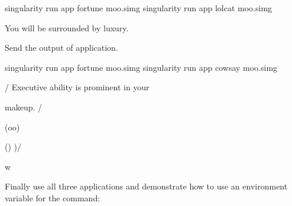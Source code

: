 \documentclass[letterpaper,10pt,english]{sphinxmanual}
\begin{document}
%
\begin{sphinxVerbatim}[commandchars=\\\{\}]
singularity run \PYGZhy{}\PYGZhy{}app fortune moo.simg \textbar{} singularity run \PYGZhy{}\PYGZhy{}app lolcat moo.simg

You will be surrounded by luxury.
\end{sphinxVerbatim}

Send the output of  application.

%
\begin{sphinxVerbatim}[commandchars=\\\{\}]
singularity run \PYGZhy{}\PYGZhy{}app fortune moo.simg \textbar{} singularity run \PYGZhy{}\PYGZhy{}app cowsay moo.simg

 \PYGZus{}\PYGZus{}\PYGZus{}\PYGZus{}\PYGZus{}\PYGZus{}\PYGZus{}\PYGZus{}\PYGZus{}\PYGZus{}\PYGZus{}\PYGZus{}\PYGZus{}\PYGZus{}\PYGZus{}\PYGZus{}\PYGZus{}\PYGZus{}\PYGZus{}\PYGZus{}\PYGZus{}\PYGZus{}\PYGZus{}\PYGZus{}\PYGZus{}\PYGZus{}\PYGZus{}\PYGZus{}\PYGZus{}\PYGZus{}\PYGZus{}\PYGZus{}\PYGZus{}\PYGZus{}\PYGZus{}\PYGZus{}\PYGZus{}\PYGZus{}\PYGZus{}\PYGZus{}

/ Executive ability is prominent in your \PYGZbs{}

\PYGZbs{} make\PYGZhy{}up.                               /

 \PYGZhy{}\PYGZhy{}\PYGZhy{}\PYGZhy{}\PYGZhy{}\PYGZhy{}\PYGZhy{}\PYGZhy{}\PYGZhy{}\PYGZhy{}\PYGZhy{}\PYGZhy{}\PYGZhy{}\PYGZhy{}\PYGZhy{}\PYGZhy{}\PYGZhy{}\PYGZhy{}\PYGZhy{}\PYGZhy{}\PYGZhy{}\PYGZhy{}\PYGZhy{}\PYGZhy{}\PYGZhy{}\PYGZhy{}\PYGZhy{}\PYGZhy{}\PYGZhy{}\PYGZhy{}\PYGZhy{}\PYGZhy{}\PYGZhy{}\PYGZhy{}\PYGZhy{}\PYGZhy{}\PYGZhy{}\PYGZhy{}\PYGZhy{}\PYGZhy{}

        \PYGZbs{}   \PYGZca{}\PYGZus{}\PYGZus{}\PYGZca{}

         \PYGZbs{}  (oo)\PYGZbs{}\PYGZus{}\PYGZus{}\PYGZus{}\PYGZus{}\PYGZus{}\PYGZus{}\PYGZus{}

            (\PYGZus{}\PYGZus{})\PYGZbs{}       )\PYGZbs{}/\PYGZbs{}

                \textbar{}\textbar{}\PYGZhy{}\PYGZhy{}\PYGZhy{}\PYGZhy{}w \textbar{}

                \textbar{}\textbar{}     \textbar{}\textbar{}
\end{sphinxVerbatim}

Finally use all three applications and demonstrate how to use an environment variable for the command:
\end{document}
